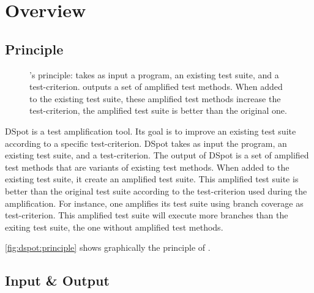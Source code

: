 \section{Overview}
\label{sec:dspot:overview}

\subsection{Principle}
\label{subsec:dspot:overview:principle}

\begin{figure}[h]
	\centering
	\caption{
		\dspot's principle: \dspot takes as input a program, an existing test suite, and a test-criterion. 
		\dspot outputs a set of amplified test methods.
		When added to the existing test suite, these amplified test methods increase the test-criterion, \ie the amplified test suite is better than the original one.
	}
	\label{fig:dspot:principle}
\end{figure}

DSpot is a test amplification tool.
Its goal is to improve an existing test suite according to a specific test-criterion.
DSpot takes as input the program, an existing test suite, and a test-criterion. 
The output of DSpot is a set of amplified test methods that are variants of existing test methods.
When added to the existing test suite, it create an amplified test suite.
This amplified test suite is better than the original test suite according to the test-criterion used during the amplification.
For instance, one amplifies its test suite using branch coverage as test-criterion.
This amplified test suite will execute more branches than the exiting test suite, \ie the one without amplified test methods.

\autoref{fig:dspot:principle} shows graphically the principle of \dspot.

\subsection{Input \& Output}
\label{subsec:dspot:overview:input-and-output}

